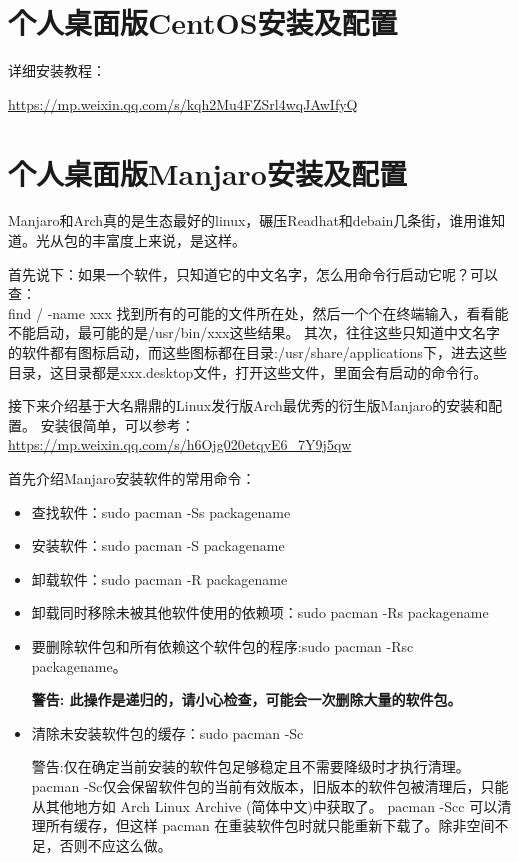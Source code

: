 \documentclass[utf8]{book}
\begin{document}
\begin{appendices}
	\chapter{个人桌面版CentOS安装及配置}\label{append2}
	详细安装教程：

	\url{https://mp.weixin.qq.com/s/kqh2Mu4FZSrl4wqJAwIfyQ}
	
	\chapter{个人桌面版Manjaro安装及配置}\label{append3}
	
	Manjaro和Arch真的是生态最好的linux，碾压Readhat和debain几条街，谁用谁知道。光从包的丰富度上来说，是这样。
	
	首先说下：如果一个软件，只知道它的中文名字，怎么用命令行启动它呢？可以查：\\
	find / -name xxx
	找到所有的可能的文件所在处，然后一个个在终端输入，看看能不能启动，最可能的是/usr/bin/xxx这些结果。
	其次，往往这些只知道中文名字的软件都有图标启动，而这些图标都在目录:/usr/share/applications下，进去这些目录，这目录都是xxx.desktop文件，打开这些文件，里面会有启动的命令行。
	
	接下来介绍基于大名鼎鼎的Linux发行版Arch最优秀的衍生版Manjaro的安装和配置。
	安装很简单，可以参考：
	\url{https://mp.weixin.qq.com/s/h6Ojg020etqyE6_7Y9j5qw}
	
	首先介绍Manjaro安装软件的常用命令：
	\begin{itemize}
		\item 查找软件：sudo pacman -Ss packagename
		\item 安装软件：sudo pacman -S packagename
		\item 卸载软件：sudo pacman -R packagename
		\item 卸载同时移除未被其他软件使用的依赖项：sudo pacman -Rs packagename
		\item 要删除软件包和所有依赖这个软件包的程序:sudo pacman -Rsc packagename。
		
		\textbf{警告: 此操作是递归的，请小心检查，可能会一次删除大量的软件包。}
		
		\item 清除未安装软件包的缓存：sudo pacman -Sc
		
		警告:仅在确定当前安装的软件包足够稳定且不需要降级时才执行清理。pacman -Sc仅会保留软件包的当前有效版本，旧版本的软件包被清理后，只能从其他地方如 Arch Linux Archive (简体中文)中获取了。 pacman -Scc 可以清理所有缓存，但这样 pacman 在重装软件包时就只能重新下载了。除非空间不足，否则不应这么做。
		

\end{itemize}
\end{appendices}
\end{document}
